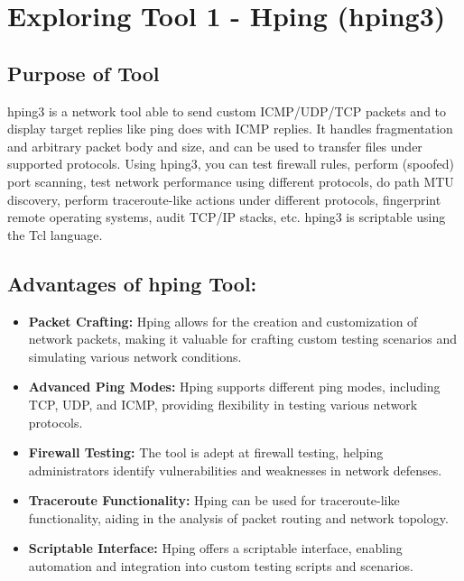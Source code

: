 \documentclass[11pt]{article}
\begin{document}
\tableofcontents
\thispagestyle{empty}
\clearpage

\setcounter{page}{1}

\section{Exploring Tool 1 - Hping (hping3)}

\subsection{Purpose of Tool}
hping3 is a network tool able to send custom ICMP/UDP/TCP packets and to display target replies like ping does with ICMP replies. It handles fragmentation and arbitrary packet body and size, and can be used to transfer files under supported protocols. Using hping3, you can test firewall rules, perform (spoofed) port scanning, test network performance using different protocols, do path MTU discovery, perform traceroute-like actions under different protocols, fingerprint remote operating systems, audit TCP/IP stacks, etc. hping3 is scriptable using the Tcl language.


\subsection{Advantages of hping Tool:}
\begin{itemize}
    \item \textbf{Packet Crafting:} Hping allows for the creation and customization of network packets, making it valuable for crafting custom testing scenarios and simulating various network conditions.
    \item \textbf{Advanced Ping Modes:} Hping supports different ping modes, including TCP, UDP, and ICMP, providing flexibility in testing various network protocols.
    \item \textbf{Firewall Testing:} The tool is adept at firewall testing, helping administrators identify vulnerabilities and weaknesses in network defenses.
    \item \textbf{Traceroute Functionality:} Hping can be used for traceroute-like functionality, aiding in the analysis of packet routing and network topology.
    \item \textbf{Scriptable Interface:} Hping offers a scriptable interface, enabling automation and integration into custom testing scripts and scenarios.
\end{itemize}
\end{document}
